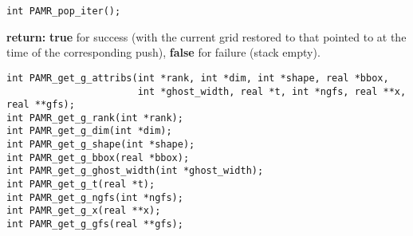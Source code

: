 \documentclass[aps,amssymb,unsortedaddress,nofootinbib]{revtex4}
\def\lsep{\itemsep 0.05in}
\begin{document}

\begin{verbatim}
int PAMR_pop_iter();
\end{verbatim}
\begin{list}{}{\lsep}
\item {\bf return:} {\bf true} for success (with the current grid restored to that
                    pointed to at the time of the corresponding push), {\bf false} for 
                    failure (stack empty).
\end{list}


\begin{verbatim}
int PAMR_get_g_attribs(int *rank, int *dim, int *shape, real *bbox,
                       int *ghost_width, real *t, int *ngfs, real **x, real **gfs);
int PAMR_get_g_rank(int *rank);
int PAMR_get_g_dim(int *dim);
int PAMR_get_g_shape(int *shape);
int PAMR_get_g_bbox(real *bbox);
int PAMR_get_g_ghost_width(int *ghost_width);
int PAMR_get_g_t(real *t);
int PAMR_get_g_ngfs(int *ngfs);
int PAMR_get_g_x(real **x);
int PAMR_get_g_gfs(real **gfs);
\end{verbatim}
\end{document}
